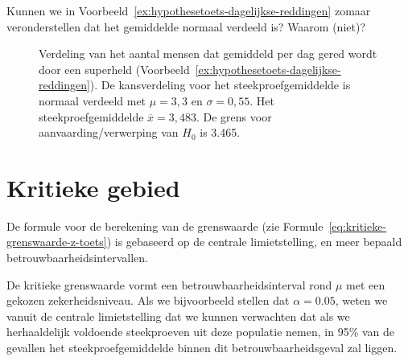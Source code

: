 \begin{exercise}
  Kunnen we in Voorbeeld~\ref{ex:hypothesetoets-dagelijkse-reddingen} zomaar veronderstellen dat het gemiddelde normaal verdeeld is? Waarom (niet)?
\end{exercise}

\begin{figure}
  \centering
  \caption{Verdeling van het aantal mensen dat gemiddeld per dag gered wordt door een superheld (Voorbeeld~\ref{ex:hypothesetoets-dagelijkse-reddingen}). De kansverdeling voor het steekproefgemiddelde is normaal verdeeld met $\mu = 3,3$ en $\sigma = 0,55$. Het steekproefgemiddelde $\overline{x} =3,483$. De grens voor aanvaarding/verwerping van $H_{0}$ is 3.465.}
  \label{fig:hypothesetoets-reddingen-per-dag}
\end{figure}

\section{Kritieke gebied}
\label{sec:kritieke-gebied}

De formule voor de berekening van de grenswaarde (zie Formule~\ref{eq:kritieke-grenswaarde-z-toets}) is gebaseerd op de centrale limietstelling, en meer bepaald betrouwbaarheidsintervallen.

De kritieke grenswaarde vormt een betrouwbaarheidsinterval rond $\mu$ met een gekozen zekerheidsniveau. Als we bijvoorbeeld stellen dat $\alpha = 0.05$, weten we vanuit de centrale limietstelling dat we kunnen verwachten dat als we herhaaldelijk voldoende steekproeven uit deze populatie nemen, in 95\% van de gevallen het steekproefgemiddelde binnen dit betrouwbaarheidsgeval zal liggen.

